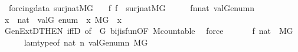 \begin{isabellebody}
\isanewline
{}\isamarkupfalse%
\ {\isacharparenleft}{\kern0pt}\ forcing{\isacharunderscore}{\kern0pt}data{\isacharparenright}{\kern0pt}\ surj{\isacharunderscore}{\kern0pt}nat{\isacharunderscore}{\kern0pt}MG\ {\isacharcolon}{\kern0pt}\isanewline
\ \ {\isachardoublequoteopen}{\isasymexists}f{\isachardot}{\kern0pt}\ f\ {\isasymin}\ surj{\isacharparenleft}{\kern0pt}nat{\isacharcomma}{\kern0pt}M{\isacharbrackleft}{\kern0pt}G{\isacharbrackright}{\kern0pt}{\isacharparenright}{\kern0pt}{\isachardoublequoteclose}\isanewline
%
\isadelimproof
%
\endisadelimproof
%
\isatagproof
{}\isamarkupfalse%
\ {\isacharminus}{\kern0pt}\isanewline
\ \ \isamarkupfalse%
\ {\isacharquery}{\kern0pt}f{\isacharequal}{\kern0pt}{\isachardoublequoteopen}{\isasymlambda}n{\isasymin}nat{\isachardot}{\kern0pt}\ val{\isacharparenleft}{\kern0pt}G{\isacharcomma}{\kern0pt}enum{\isacharbackquote}{\kern0pt}n{\isacharparenright}{\kern0pt}{\isachardoublequoteclose}\isanewline
\ \ \isamarkupfalse%
\ {\isachardoublequoteopen}x\ {\isasymin}\ nat\ {\isasymLongrightarrow}\ val{\isacharparenleft}{\kern0pt}G{\isacharcomma}{\kern0pt}\ enum\ {\isacharbackquote}{\kern0pt}\ x{\isacharparenright}{\kern0pt}{\isasymin}\ M{\isacharbrackleft}{\kern0pt}G{\isacharbrackright}{\kern0pt}{\isachardoublequoteclose}\ \ x\isanewline
\ \ \ \ \isamarkupfalse%
\ GenExtD{\isacharbrackleft}{\kern0pt}THEN\ iffD{}{\isacharcomma}{\kern0pt}\ of\ {\isacharunderscore}{\kern0pt}\ G{\isacharbrackright}{\kern0pt}\ bij{\isacharunderscore}{\kern0pt}is{\isacharunderscore}{\kern0pt}fun{\isacharbrackleft}{\kern0pt}OF\ M{\isacharunderscore}{\kern0pt}countable{\isacharbrackright}{\kern0pt}\ \isamarkupfalse%
\ force\isanewline
\ \ \isamarkupfalse%
\isanewline
\ \ \isamarkupfalse%
\ {\isachardoublequoteopen}{\isacharquery}{\kern0pt}f{\isacharcolon}{\kern0pt}\ nat\ {\isasymrightarrow}\ M{\isacharbrackleft}{\kern0pt}G{\isacharbrackright}{\kern0pt}{\isachardoublequoteclose}\isanewline
\ \ \ \ \isamarkupfalse%
\ lam{\isacharunderscore}{\kern0pt}type{\isacharbrackleft}{\kern0pt}of\ nat\ {\isachardoublequoteopen}{\isasymlambda}n{\isachardot}{\kern0pt}\ val{\isacharparenleft}{\kern0pt}G{\isacharcomma}{\kern0pt}enum{\isacharbackquote}{\kern0pt}n{\isacharparenright}{\kern0pt}{\isachardoublequoteclose}\ {\isachardoublequoteopen}{\isasymlambda}{\isacharunderscore}{\kern0pt}{\isachardot}{\kern0pt}M{\isacharbrackleft}{\kern0pt}G{\isacharbrackright}{\kern0pt}{\isachardoublequoteclose}{\isacharbrackright}{\kern0pt}\ \isamarkupfalse%

\end{isabellebody}
